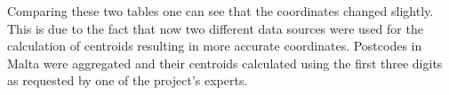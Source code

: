 Comparing these two tables one can see that the coordinates changed slightly. This is due to the fact that now two different data sources were used for the calculation of centroids resulting in more accurate coordinates.
Postcodes in Malta were aggregated and their centroids calculated using the first three digits as requested by one of the project's experts. 
